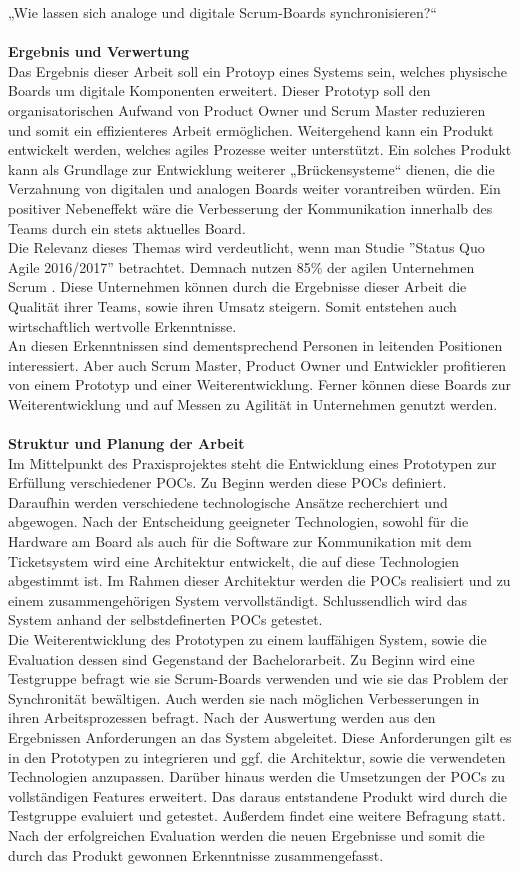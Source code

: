 \documentclass[12pt,titlepage]{scrartcl}
\begin{document}
„Wie lassen sich analoge und digitale Scrum-Boards synchronisieren?“ \\ \\
\textbf{Ergebnis und Verwertung} \\
Das Ergebnis dieser Arbeit soll ein Protoyp eines Systems sein, welches physische Boards um digitale Komponenten erweitert. Dieser Prototyp soll den organisatorischen Aufwand von Product Owner und Scrum Master reduzieren und somit ein effizienteres Arbeit ermöglichen. Weitergehend kann ein Produkt entwickelt werden, welches agiles Prozesse weiter unterstützt. 
Ein solches Produkt kann als Grundlage zur Entwicklung weiterer „Brückensysteme“ dienen, die die Verzahnung von digitalen und analogen Boards weiter vorantreiben würden. Ein positiver Nebeneffekt wäre die Verbesserung der Kommunikation innerhalb des Teams durch ein stets aktuelles Board. \\
Die Relevanz dieses Themas wird verdeutlicht, wenn man Studie ''Status Quo Agile 2016/2017'' betrachtet. Demnach nutzen 85\% der agilen Unternehmen Scrum \cite{hskob}. Diese Unternehmen können durch die Ergebnisse dieser Arbeit die Qualität ihrer Teams, sowie ihren Umsatz steigern. Somit entstehen auch wirtschaftlich wertvolle Erkenntnisse. \\
An diesen Erkenntnissen sind dementsprechend Personen in leitenden Positionen interessiert. Aber auch Scrum Master, Product Owner und Entwickler profitieren von einem Prototyp und einer Weiterentwicklung. Ferner können diese Boards zur Weiterentwicklung und auf Messen zu Agilität in Unternehmen genutzt werden. \\ \\
\textbf{Struktur und Planung der Arbeit} \\
Im Mittelpunkt des Praxisprojektes steht die Entwicklung eines Prototypen zur Erfüllung verschiedener POCs. Zu Beginn werden diese POCs definiert. Daraufhin werden verschiedene technologische Ansätze recherchiert und abgewogen. Nach der Entscheidung geeigneter Technologien, sowohl für die Hardware am Board als auch für die Software zur Kommunikation mit dem Ticketsystem wird eine Architektur entwickelt, die auf diese Technologien abgestimmt ist. Im Rahmen dieser Architektur werden die POCs realisiert und zu einem zusammengehörigen System vervollständigt. Schlussendlich wird das System anhand der selbstdefinerten POCs getestet.\\
Die Weiterentwicklung des Prototypen zu einem lauffähigen System, sowie die Evaluation dessen sind Gegenstand der Bachelorarbeit. Zu Beginn wird eine Testgruppe befragt wie sie Scrum-Boards verwenden und wie sie das Problem der Synchronität bewältigen. Auch werden sie nach möglichen Verbesserungen in ihren Arbeitsprozessen befragt. Nach der Auswertung werden aus den Ergebnissen Anforderungen an das System abgeleitet. Diese Anforderungen gilt es in den Prototypen zu integrieren und ggf. die Architektur, sowie die verwendeten Technologien anzupassen. Darüber hinaus werden die Umsetzungen der POCs zu vollständigen Features erweitert. Das daraus entstandene Produkt wird durch die Testgruppe evaluiert und getestet. Außerdem findet eine weitere Befragung statt. Nach der erfolgreichen Evaluation werden die neuen Ergebnisse und somit die durch das Produkt gewonnen Erkenntnisse zusammengefasst.
\end{document}
